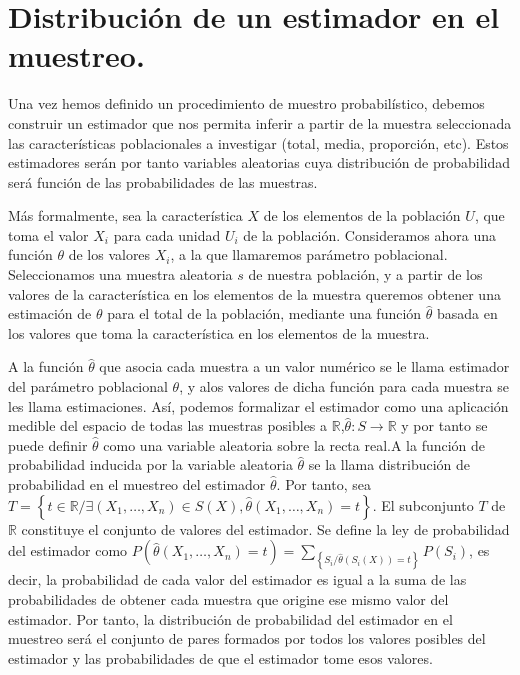 \section{Distribuci\'on de un estimador en el muestreo.}

Una vez hemos definido un procedimiento de muestro probabil\'istico,
debemos construir un estimador que nos permita inferir a partir de
la muestra seleccionada las caracter\'isticas poblacionales a investigar
(total, media, proporci\'on, etc). Estos estimadores ser\'an por tanto
variables aleatorias cuya distribuci\'on de probabilidad ser\'a funci\'on
de las probabilidades de las muestras.

M\'as formalmente, sea la caracter\'istica $X$ de los elementos de la
poblaci\'on $U$, que toma el valor $X_{i}$ para cada unidad $U_{i}$
de la poblaci\'on. Consideramos ahora una funci\'on $\theta$ de los valores
$X_{i}$, a la que llamaremos par\'ametro poblacional. Seleccionamos
una muestra aleatoria $s$ de nuestra poblaci\'on, y a partir de los
valores de la caracter\'istica en los elementos de la muestra queremos
obtener una estimaci\'on de $\theta$ para el total de la poblaci\'on,
mediante una funci\'on $\hat{\theta}$ basada en los valores que toma
la caracter\'istica en los elementos de la muestra.

A la funci\'on $\hat{\theta}$ que asocia cada muestra a un valor num\'erico
se le llama estimador del par\'ametro poblacional $\theta$, y alos
valores de dicha funci\'on para cada muestra se les llama estimaciones.
As\'i, podemos formalizar el estimador como una aplicaci\'on medible del
espacio de todas las muestras posibles a $\mathbb{R}$,$\hat{\theta}:S\rightarrow\mathbb{R}$
y por tanto se puede definir $\hat{\theta}$ como una variable aleatoria
sobre la recta real.A la funci\'on de probabilidad inducida por la variable
aleatoria $\hat{\theta}$ se la llama distribuci\'on de probabilidad
en el muestreo del estimador $\hat{\theta}$. Por tanto, sea $T=\left\{ t\in\mathbb{R}/\exists\left(X_{1},\ldots,X_{n}\right)\in S\left(X\right),\hat{\theta}\left(X_{1},\ldots,X_{n}\right)=t\right\} $.
El subconjunto $T$ de $\mathbb{R}$ constituye el conjunto de valores
del estimador. Se define la ley de probabilidad del estimador como
$P\left(\hat{\theta}\left(X_{1},\ldots,X_{n}\right)=t\right)=\sum_{\left\{ S_{i}/\hat{\theta}\left(S_{i}\left(X\right)\right)=t\right\} }P\left(S_{i}\right)$,
es decir, la probabilidad de cada valor del estimador es igual a la
suma de las probabilidades de obtener cada muestra que origine ese
mismo valor del estimador. Por tanto, la distribuci\'on de probabilidad
del estimador en el muestreo ser\'a el conjunto de pares formados por
todos los valores posibles del estimador y las probabilidades de que
el estimador tome esos valores.

